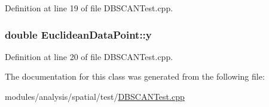 Definition at line 19 of file D\-B\-S\-C\-A\-N\-Test.\-cpp.

\hypertarget{classEuclideanDataPoint_a108d29336be8bf0bd1aa53c40df3bd68}{
\subsubsection[{y}]{\setlength{\rightskip}{0pt plus 5cm}double Euclidean\-Data\-Point\-::y\hspace{0.3cm}{\ttfamily [private]}}}\label{classEuclideanDataPoint_a108d29336be8bf0bd1aa53c40df3bd68}


Definition at line 20 of file D\-B\-S\-C\-A\-N\-Test.\-cpp.



The documentation for this class was generated from the following file\-:\begin{DoxyCompactItemize}
\item 
modules/analysis/spatial/test/\hyperlink{DBSCANTest_8cpp}{D\-B\-S\-C\-A\-N\-Test.\-cpp}\end{DoxyCompactItemize}
